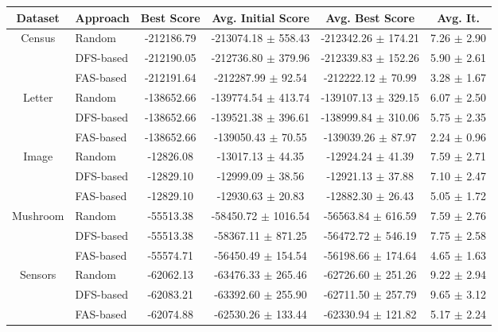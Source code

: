 \centering
\begin{tabular}{| c | l | c | c | c | c | }
	\hline
	Dataset & Approach & Best Score & Avg. Initial Score & Avg. Best Score & Avg. It. \\ \hline
	\multirow{3}{*}{Census} & Random & \alert{-212186.79} & -213074.18 $\pm$ 558.43 & -212342.26 $\pm$ 174.21 & 7.26 $\pm$ 2.90 \\ \cline{2-6} 
			& DFS-based & -212190.05 & -212736.80 $\pm$ 379.96 & -212339.83 $\pm$ 152.26 & 5.90 $\pm$ 2.61 \\ \cline{2-6}
			& FAS-based & -212191.64 & \alert{-212287.99 $\pm$ 92.54} & \alert{-212222.12 $\pm$ 70.99} & \alert{3.28 $\pm$ 1.67} \\ \hline \hline

	\multirow{3}{*}{Letter} & Random & -138652.66 & -139774.54 $\pm$ 413.74 & -139107.13 $\pm$ 329.15 & 6.07 $\pm$ 2.50 \\ \cline{2-6} 
			& DFS-based & -138652.66 & -139521.38 $\pm$ 396.61 & \alert{-138999.84 $\pm$ 310.06} & 5.75 $\pm$ 2.35 \\ \cline{2-6}
			& FAS-based & -138652.66 & \alert{-139050.43 $\pm$ 70.55} & -139039.26 $\pm$ 87.97 & \alert{2.24 $\pm$ 0.96} \\ \hline \hline

	\multirow{3}{*}{Image} & Random & \alert{-12826.08} & -13017.13 $\pm$ 44.35 & -12924.24 $\pm$ 41.39 & 7.59 $\pm$ 2.71 \\ \cline{2-6} 
			& DFS-based & -12829.10 & -12999.09 $\pm$ 38.56 & -12921.13 $\pm$ 37.88 & 7.10 $\pm$ 2.47 \\ \cline{2-6}
			& FAS-based & -12829.10 & \alert{-12930.63 $\pm$ 20.83} & \alert{-12882.30 $\pm$ 26.43} & \alert{5.05 $\pm$ 1.72} \\ \hline \hline

	\multirow{3}{*}{Mushroom} & Random & \alert{-55513.38} & -58450.72 $\pm$ 1016.54 & -56563.84 $\pm$ 616.59 & 7.59 $\pm$ 2.76 \\ \cline{2-6} 
			& DFS-based & \alert{-55513.38} & -58367.11 $\pm$ 871.25 & -56472.72 $\pm$ 546.19 & 7.75 $\pm$ 2.58 \\ \cline{2-6}
			& FAS-based & -55574.71 & \alert{-56450.49 $\pm$ 154.54} & \alert{-56198.66 $\pm$ 174.64} & \alert{4.65 $\pm$ 1.63} \\ \hline \hline

	\multirow{3}{*}{Sensors} & Random & \alert{-62062.13} & -63476.33 $\pm$ 265.46 & -62726.60 $\pm$ 251.26 & 9.22 $\pm$ 2.94 \\ \cline{2-6} 
			& DFS-based & -62083.21 & -63392.60 $\pm$ 255.90 & -62711.50 $\pm$ 257.79 & 9.65 $\pm$ 3.12 \\ \cline{2-6}
			& FAS-based & -62074.88 & \alert{-62530.26 $\pm$ 133.44} & \alert{-62330.94 $\pm$ 121.82} & \alert{5.17 $\pm$ 2.24} \\ \hline
\end{tabular}